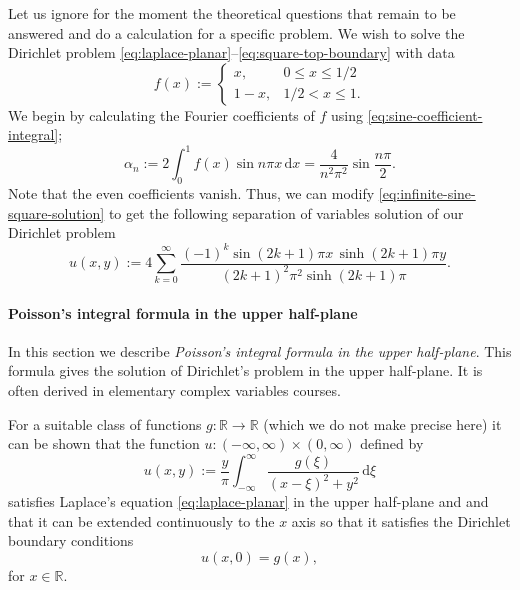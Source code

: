\begin{Example}
\label{ex:tent-dirichlet-data}
Let us ignore for the moment the theoretical questions that remain to be answered and do a calculation for a specific problem. We wish to solve the Dirichlet problem \eqref{eq:laplace-planar}--\eqref{eq:square-top-boundary} with data
\begin{equation}\label{eq:tent-boundary-data}
f(x):=\begin{cases}x,&0\leq x\leq1/2\\1-x,&1/2<x\leq1.\end{cases}
\end{equation}
We begin by calculating the Fourier coefficients of $f$ using \eqref{eq:sine-coefficient-integral};
\begin{equation}\label{eq:tent-sine-coefficients}
\alpha_n:=2\int_0^1f(x)\sin n\pi x\,\mathrm{d}x=\dfrac{4}{n^2\pi^2}\sin\dfrac{n\pi}{2}.
\end{equation}
Note that the even coefficients vanish. Thus, we can modify \eqref{eq:infinite-sine-square-solution} to get the following separation of variables solution of our Dirichlet problem
\begin{equation}\label{eq:tent-square-solution}
u(x,y):=4\sum_{k=0}^{\infty}\dfrac{(-1)^k\sin(2k+1)\pi x\,\sinh(2k+1)\pi y}{(2k+1)^2\pi^2\sinh(2k+1)\pi}.
\end{equation}

\end{Example}

\paragraph*{Poisson's integral formula in the upper half-plane}

In this section we describe \emph{Poisson's integral formula in the upper half-plane}. This formula gives the solution of Dirichlet's problem in the upper half-plane. It is often derived in elementary complex variables courses.

For a suitable class of functions $g:\mathbb{R}\to\mathbb{R}$ (which we do not make precise here) it can be shown that the function $u:(-\infty,\infty)\times(0,\infty)$ defined by
\begin{equation}\label{eq:poisson-upper-half-plane}
u(x,y):=\dfrac{y}{\pi}\int_{-\infty}^{\infty}\dfrac{g(\xi)}{(x-\xi)^2+y^2}\,\mathrm{d}\xi
\end{equation}
satisfies Laplace's equation \eqref{eq:laplace-planar} in the upper half-plane and and that it can be extended continuously to the $x$ axis so that it satisfies the Dirichlet boundary conditions
\begin{equation}\label{eq:poisson-dirichlet-data}
u(x,0)=g(x),
\end{equation}
for $x\in\mathbb{R}$.

